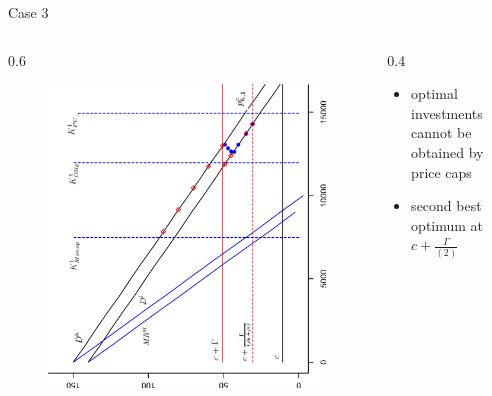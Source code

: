 \begin{frame} {Case 3}					
\begin{columns}
\begin{column} {0.6\textwidth}
\begin{figure}[h]
\centering
\includegraphics[width=1.0\textwidth, angle=270]{66}
    \label{fig:1}            
\end{figure}
\end{column}

\begin{column} {0.4\textwidth}

\begin{itemize}
	\item optimal investments cannot be obtained by price caps
	\item second best optimum at $c+\tfrac{\Gamma}{(2)}$
\end{itemize}

\end{column}
\end{columns}

\end{frame}


